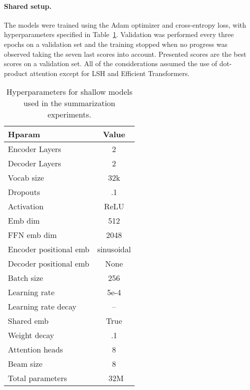 \documentclass{article}
\begin{document}
{
\paragraph{Shared setup.}
The models were trained using the Adam optimizer and cross-entropy loss, with hyperparameters specified in Table~\ref{tab:hp}. Validation was performed every three epochs on a validation set and the training stopped when no progress was observed taking the seven last scores into account. Presented scores are the best scores on a validation set. All of the considerations assumed the use of dot-product attention except for LSH and Efficient Transformers.
\begin{table}
\caption{Hyperparameters for shallow models used in the summarization experiments.}
\label{tab:hp}
\centering
\begin{tabular}{lc}
    \toprule
    Hparam & Value \\
    \midrule
    Encoder Layers & 2 \\
    Decoder Layers & 2 \\
    Vocab size & 32k \\
    Dropouts  & .1    \\
    Activation & ReLU \\
    Emb dim & 512 \\
    FFN emb dim & 2048  \\
    Encoder positional emb & sinusoidal \\
    Decoder positional emb & None \\
    Batch size          & 256 \\
    Learning rate       & 5e-4 \\
    Learning rate decay & -- \\
    Shared emb & True \\
    Weight decay        & .1 \\
    Attention heads & 8 \\
    Beam size & 8 \\
    Total parameters & ~32M \\
    \bottomrule
\end{tabular}
\end{table}


}
\end{document}
